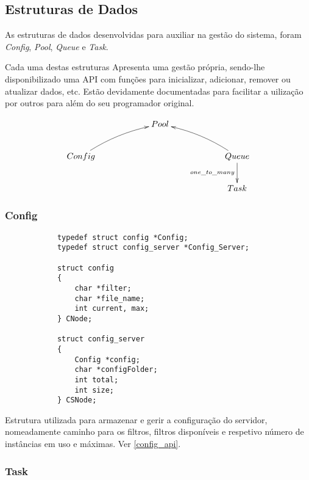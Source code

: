 \documentclass[11pt]{article}
\begin{document}
\subsection{Estruturas de Dados}

As estruturas de dados desenvolvidas para auxiliar na gestão do sistema, foram \textit{Config}, \textit{Pool}, \textit{Queue} e \textit{Task}.

Cada uma destas estruturas Apresenta uma gestão própria, sendo-lhe disponibilizado uma API com funções para inicializar, adicionar,
remover ou atualizar dados, etc. Estão devidamente documentadas para facilitar a uilização por outros para além do seu programador
original.

\begin{equation*}
    \xymatrixcolsep{5pc}\xymatrix {
    & Pool \\
    Config\ar@/^/[ur] & & Queue\ar@/_/[ul]\ar[d]_{one\_to\_many} \\
    & & Task
    }
\end{equation*}

\subsubsection{Config} \label{config}

\begin{verbatim}
            typedef struct config *Config;
            typedef struct config_server *Config_Server;
            
            struct config
            {
                char *filter;
                char *file_name;
                int current, max;
            } CNode;

            struct config_server
            {
                Config *config;
                char *configFolder;
                int total;
                int size;
            } CSNode;

			\end{verbatim}

Estrutura utilizada para armazenar e gerir a configuração do servidor, nomeadamente caminho para os filtros,
filtros disponíveis e respetivo número de instâncias em uso e máximas. Ver \ref{config_api}.

\subsubsection{Task}\label{task}
\end{document}
